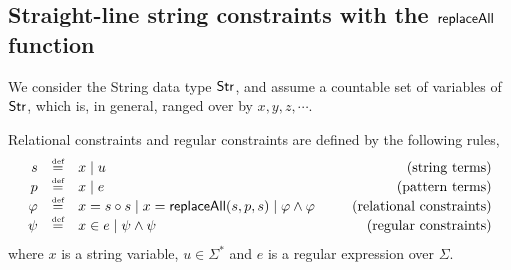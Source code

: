 

\subsection{Straight-line string constraints with the $\mathsf{replaceAll}$ function}


We consider the String data type ${\sf Str}$, and assume a countable set of variables of ${\sf Str}$, which is, in general, ranged over by $x, y, z, \cdots$.  



\begin{definition}
	Relational constraints and regular constraints are defined by the following rules,
	\[
	\begin{array}{r c l cr}
	s &\eqdef & x \mid u & \ \ & \mbox{(string terms)}\\
	p &\eqdef & x \mid e & \ \ & \mbox{(pattern terms)}\\
	\varphi &\eqdef & x = s \concat s  \mid  x = \replaceall(s, p, s) \mid \varphi \wedge \varphi & \ \ & \mbox{(relational constraints)}\\
	\psi & \eqdef & x \in e \mid \psi \wedge \psi %
	& \ \ & \mbox{(regular constraints)} \\
	\end{array}
	\]
	where $x$ is a string variable, $u \in \Sigma^\ast$ and $e$ is a regular expression over $\Sigma$. 
	
%	
\end{definition}


